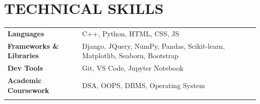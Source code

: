 \documentclass[12pt]{article}
\begin{document}
\section*{TECHNICAL SKILLS}
\begin{tabular}{@{}llll}
	\textbf{Languages}               & C++, Python, HTML, CSS, JS                                                  \\
	\textbf{Frameworks \& Libraries} & Django, JQuery, NumPy, Pandas, Scikit-learn, Matplotlib, Seaborn, Bootstrap \\
	\textbf{Dev Tools}               & Git, VS Code, Jupyter Notebook                                              \\
	\textbf{Academic Coursework}     & DSA, OOPS, DBMS, Operating System                                           \\
	\vspace{-\topsep}
\end{tabular}
\end{document}

